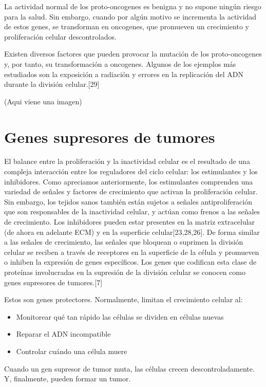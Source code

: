 \hspace{.1cm}La actividad normal de los proto-oncogenes es benigna y no supone ningún riesgo para la salud. Sin embargo, cuando por algún motivo se incrementa la actividad de estos genes, se transforman en oncogenes, que promueven un crecimiento y proliferación celular descontrolados.

\hspace{.1cm}Existen diversos factores que pueden provocar la mutación de los proto-oncogenes y, por tanto, su transformación a oncogenes. Algunos de los ejemplos más estudiados son la exposición a radiación y errores en la replicación del ADN durante la división celular.[29]

(Aqui viene una imagen)


\section{Genes supresores de tumores}
\hspace{.1cm}El balance entre la proliferación y la inactividad celular es el resultado de una compleja interacción entre los reguladores del ciclo celular: los estimulantes y los inhibidores. Como apreciamos anteriormente, los estimulantes comprenden una variedad de señales y factores de crecimiento que activan la proliferación celular. Sin embargo, los tejidos sanos también están sujetos a señales antiproliferación que son responsables de la inactividad celular, y actúan como frenos a las señales de crecimiento. Los inhibidores pueden estar presentes en la matriz extracelular (de ahora en adelante ECM) y en la superficie celular[23,28,26]. De forma similar a las señales de crecimiento, las señales que bloquean o suprimen la división celular se reciben a través de receptores en la superficie de la célula y promueven o inhiben la expresión de genes específicos. Los genes que codifican esta clase de proteínas involucradas en la supresión de la división celular se conocen como genes supresores de tumores.[7]

\hspace{.1cm}Estos son genes protectores. Normalmente, limitan el crecimiento celular al:
\begin{itemize}
    \item Monitorear qué tan rápido las células se dividen en células nuevas
    \item Reparar el ADN incompatible
    \item Controlar cuándo una célula muere
\end{itemize}
Cuando un gen supresor de tumor muta, las células crecen descontroladamente. Y, finalmente, pueden formar un tumor.

